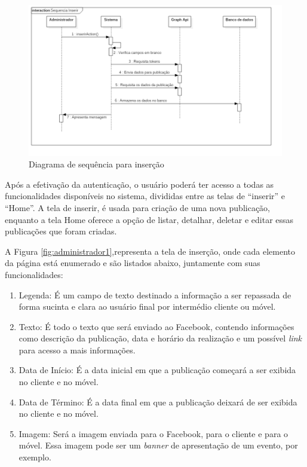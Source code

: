  \begin{figure}[H]
\centering
\includegraphics[width=\textwidth]{figuras/sequenciainserir}
\caption{Diagrama de sequência para inserção}
\label{fig:sequenciainserir}
\end{figure}

Após a efetivação da autenticação, o usuário poderá ter acesso a todas as funcionalidades disponíveis no sistema, divididas entre as telas de ``inserir'' e ``Home''. A tela de inserir, é usada para criação de uma nova publicação, enquanto a tela Home oferece a opção de listar, detalhar, deletar e editar essas publicações que foram criadas.

A Figura \ref{fig:administrador1},representa a tela de inserção, onde cada elemento da página está enumerado e são listados abaixo, juntamente com suas funcionalidades: 

\begin{enumerate}
   \item Legenda: É um campo de texto destinado a informação a ser repassada de forma sucinta e clara ao usuário final por intermédio cliente ou móvel. 
   \item Texto: É todo o texto que será enviado ao Facebook, contendo informações como descrição da publicação, data e horário da realização e um possível \textit{link} para acesso a mais informações. 
   \item Data de Início: É a data inicial em que a publicação começará a ser exibida no cliente e no móvel.
   \item Data de Término: É a data final em que a publicação deixará de ser exibida no cliente e no móvel.
   \item Imagem: Será a imagem enviada para o Facebook, para o cliente e para o móvel. Essa imagem pode ser um \textit{banner} de apresentação de um evento, por exemplo.
 \end{enumerate}
 
